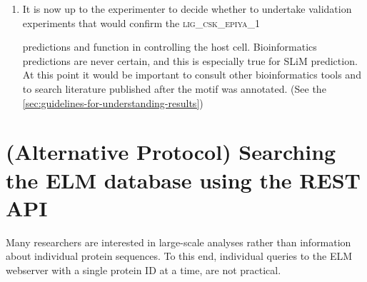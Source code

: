\documentclass[12pt]{article}
\newcommand\button[1]{%
	\textbf{#1}%
}
\newcommand\motif[1]{%
    \textsc{\lowercase{#1}}%
}
\newcommand\uniprot[1]{%
	\textsc{\lowercase{#1}}%
}
\begin{document}
\begin{enumerate}


%

\item It is now up to the experimenter to decide whether to undertake
	validation experiments that would confirm the \motif{LIG\_CSK\_EPIYA\_1}
	predictions and function in controlling the host cell. Bioinformatics
	predictions are never certain, and this is especially true for SLiM
	prediction.  At this point it would be important to consult other
	bioinformatics tools and to search literature published after the motif
	was annotated.
	(See the \ref{sec:guidelines-for-understanding-results})

\end{enumerate}


\section{(Alternative Protocol) Searching the ELM database using the REST API}
\label{sec:search_REST}

Many researchers are interested in large-scale analyses rather than
information about individual protein sequences. To this end, individual
queries to the ELM webserver with a single protein ID at a time, are not
practical.
\end{document}
